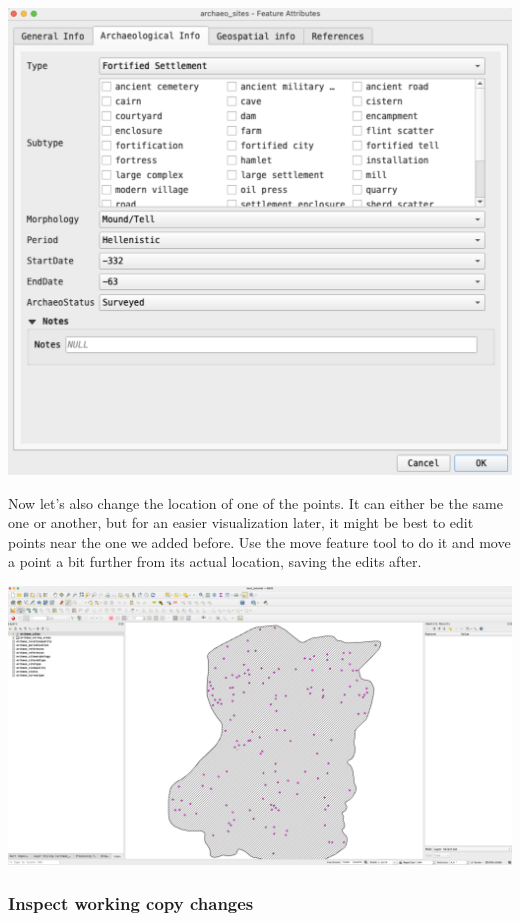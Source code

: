 \documentclass[
  letterpaper,
  DIV=11,
  numbers=noendperiod]{scrartcl}
\begin{document}
\begin{center}
\includegraphics{img/qgis-attr-table.png}
\end{center}

Now let's also change the location of one of the points. It can either
be the same one or another, but for an easier visualization later, it
might be best to edit points near the one we added before. Use the move
feature tool to do it and move a point a bit further from its actual
location, saving the edits after.

\begin{center}
\includegraphics{img/qgis-move-feature.png}
\end{center}

\subsubsection{Inspect working copy
changes}\label{inspect-working-copy-changes}
\end{document}
